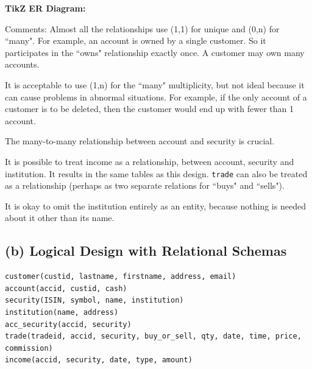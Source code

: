 \noindent \textbf{TikZ ER Diagram:}
\begin{center}
\end{center}

Comments: Almost all the relationships use (1,1) for unique and (0,n) for ``many". For example, an account is owned by a single customer. So it participates in the ``owns" relationship exactly once. A customer may own many accounts.

It is acceptable to use (1,n) for the ``many" multiplicity, but not ideal because it can cause problems in abnormal situations. For example, if the only account of a customer is to be deleted, then the customer would end up with fewer than 1 account.

The many-to-many relationship between account and security is crucial.

It is possible to treat income as a relationship, between account, security and institution. It results in the same tables as this design. \texttt{trade} can also be treated as a relationship (perhaps as two separate relations for ``buys" and ``sells").

It is okay to omit the institution entirely as an entity, because nothing is needed about it other than its name.

\subsection*{(b) Logical Design with Relational Schemas}

\begin{verbatim}
customer(custid, lastname, firstname, address, email)
account(accid, custid, cash)
security(ISIN, symbol, name, institution)
institution(name, address)
acc_security(accid, security)
trade(tradeid, accid, security, buy_or_sell, qty, date, time, price, commission)
income(accid, security, date, type, amount)
\end{verbatim}

